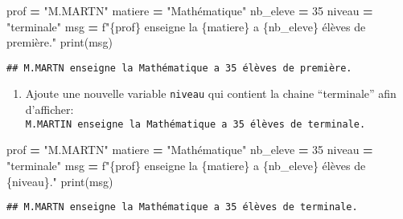 \documentclass[
]{book}
\newenvironment{Shaded}{\begin{snugshade}}{\end{snugshade}}
\newcommand{\BuiltInTok}[1]{#1}
\newcommand{\DecValTok}[1]{\textcolor[rgb]{0.00,0.00,0.81}{#1}}
\newcommand{\NormalTok}[1]{#1}
\newcommand{\OperatorTok}[1]{\textcolor[rgb]{0.81,0.36,0.00}{\textbf{#1}}}
\newcommand{\SpecialCharTok}[1]{\textcolor[rgb]{0.00,0.00,0.00}{#1}}
\newcommand{\SpecialStringTok}[1]{\textcolor[rgb]{0.31,0.60,0.02}{#1}}
\newcommand{\StringTok}[1]{\textcolor[rgb]{0.31,0.60,0.02}{#1}}
\providecommand{\tightlist}{%
  \setlength{\itemsep}{0pt}\setlength{\parskip}{0pt}}
\def\tightlist{}
\begin{document}
\begin{Shaded}
\begin{Highlighting}[]
\NormalTok{prof }\OperatorTok{=} \StringTok{"M.MARTN"}
\NormalTok{matiere }\OperatorTok{=} \StringTok{"Mathématique"}
\NormalTok{nb\_eleve }\OperatorTok{=} \DecValTok{35}
\NormalTok{niveau }\OperatorTok{=} \StringTok{"terminale"}
\NormalTok{msg }\OperatorTok{=} \SpecialStringTok{f"}\SpecialCharTok{\{}\NormalTok{prof}\SpecialCharTok{\}}\SpecialStringTok{ enseigne la }\SpecialCharTok{\{}\NormalTok{matiere}\SpecialCharTok{\}}\SpecialStringTok{ a }\SpecialCharTok{\{}\NormalTok{nb\_eleve}\SpecialCharTok{\}}\SpecialStringTok{ élèves de première."} 
\BuiltInTok{print}\NormalTok{(msg)}
\end{Highlighting}
\end{Shaded}

\begin{verbatim}
## M.MARTN enseigne la Mathématique a 35 élèves de première.
\end{verbatim}

\begin{enumerate}
\def\labelenumi{\arabic{enumi}.}
\setcounter{enumi}{3}
\tightlist
\item
  Ajoute une nouvelle variable \texttt{niveau} qui contient la chaine ``terminale'' afin d'afficher: \texttt{M.MARTIN\ enseigne\ la\ Mathématique\ a\ 35\ élèves\ de\ terminale.}
\end{enumerate}

\begin{Shaded}
\begin{Highlighting}[]
\NormalTok{prof }\OperatorTok{=} \StringTok{"M.MARTN"}
\NormalTok{matiere }\OperatorTok{=} \StringTok{"Mathématique"}
\NormalTok{nb\_eleve }\OperatorTok{=} \DecValTok{35}
\NormalTok{niveau }\OperatorTok{=} \StringTok{"terminale"}
\NormalTok{msg }\OperatorTok{=} \SpecialStringTok{f"}\SpecialCharTok{\{}\NormalTok{prof}\SpecialCharTok{\}}\SpecialStringTok{ enseigne la }\SpecialCharTok{\{}\NormalTok{matiere}\SpecialCharTok{\}}\SpecialStringTok{ a }\SpecialCharTok{\{}\NormalTok{nb\_eleve}\SpecialCharTok{\}}\SpecialStringTok{ élèves de }\SpecialCharTok{\{}\NormalTok{niveau}\SpecialCharTok{\}}\SpecialStringTok{."} 
\BuiltInTok{print}\NormalTok{(msg)}
\end{Highlighting}
\end{Shaded}

\begin{verbatim}
## M.MARTN enseigne la Mathématique a 35 élèves de terminale.
\end{verbatim}
\end{document}
